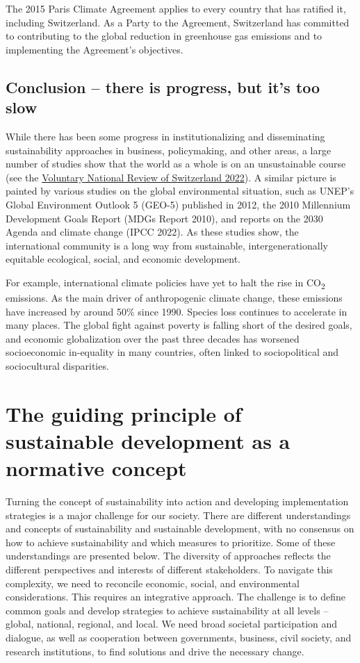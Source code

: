 \documentclass[
  a4paper,
  DIV=11,
  numbers=noendperiod,
  oneside,
  openany]{scrreprt}
\begin{document}
The 2015 Paris Climate Agreement applies to every country that has
ratified it, including Switzerland. As a Party to the Agreement,
Switzerland has committed to contributing to the global reduction in
greenhouse gas emissions and to implementing the Agreement's objectives.

\subsection{Conclusion -- there is progress, but it's too
slow}\label{conclusion-there-is-progress-but-its-too-slow}

While there has been some progress in institutionalizing and
disseminating sustainability approaches in business, policymaking, and
other areas, a large number of studies show that the world as a whole is
on an unsustainable course (see the
\href{https://www.sdgital2030.ch/countryreport}{Voluntary National
Review of Switzerland 2022}). A similar picture is painted by various
studies on the global environmental situation, such as UNEP's Global
Environment Outlook 5 (GEO-5) published in 2012, the 2010 Millennium
Development Goals Report (MDGs Report 2010), and reports on the 2030
Agenda and climate change (IPCC 2022). As these studies show, the
international community is a long way from sustainable,
intergenerationally equitable ecological, social, and economic
development.

For example, international climate policies have yet to halt the rise in
CO\textsubscript{2} emissions. As the main driver of anthropogenic
climate change, these emissions have increased by around 50\% since
1990. Species loss continues to accelerate in many places. The global
fight against poverty is falling short of the desired goals, and
economic globalization over the past three decades has worsened
socioeconomic in-equality in many countries, often linked to
sociopolitical and sociocultural disparities.

\section{The guiding principle of sustainable development as a normative
concept}\label{the-guiding-principle-of-sustainable-development-as-a-normative-concept}

Turning the concept of sustainability into action and developing
implementation strategies is a major challenge for our society. There
are different understandings and concepts of sustainability and
sustainable development, with no consensus on how to achieve
sustainability and which measures to prioritize. Some of these
understandings are presented below. The diversity of approaches reflects
the different perspectives and interests of different stakeholders. To
navigate this complexity, we need to reconcile economic, social, and
environmental considerations. This requires an integrative approach. The
challenge is to define common goals and develop strategies to achieve
sustainability at all levels -- global, national, regional, and local.
We need broad societal participation and dialogue, as well as
cooperation between governments, business, civil society, and research
institutions, to find solutions and drive the necessary change.
\end{document}
